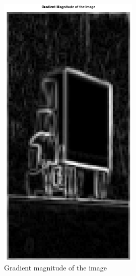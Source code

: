 \documentclass[a4paper]{article}
\begin{document}
\begin{minipage}{0.49\textwidth}
\begin{figure}[H]
    \centering
    \includegraphics[width=0.6\textwidth]{./images/3_gradient_magnitude.png}
    \caption{Gradient magnitude of the image}
\end{figure}
\end{minipage}
\end{document}
